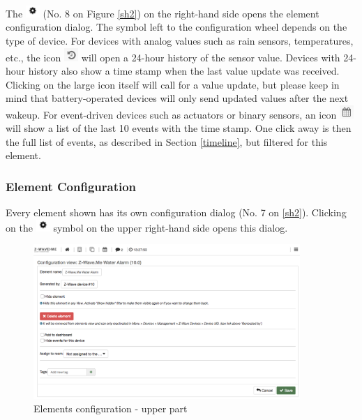The \includegraphics[width=0.04\textwidth]{pngs/wheel.png} (No. 8 on Figure \ref{sh2}) on 
the right-hand side opens the element configuration dialog. The symbol left to the configuration 
wheel depends on the type of device. For devices with analog values such as rain sensors, 
temperatures, etc., the icon \includegraphics[width=0.04\textwidth]{pngs/24hour.png} will 
open a 24-hour history of the sensor value. Devices 
with 24-hour history also show a time stamp when the last value update was received. 
Clicking on the large icon itself will call for a value update, but please keep in mind 
that battery-operated devices will only send updated values after the next wakeup.
For event-driven devices such as actuators or binary sensors, an icon 
\includegraphics[width=0.04\textwidth]{pngs/10events.png}
will show a list 
of the last 10 events with the time stamp. One click away is then the full list of 
events, as described in Section \ref{timeline}, but filtered for this element.

\subsubsection{Element Configuration}
\label{ElementConfiguration}

Every element shown has its own configuration dialog (No. 7 on \ref{sh2}). Clicking 
on the \includegraphics[width=0.04\textwidth]{pngs/wheel.png} symbol on the upper right-hand 
side opens this dialog.

\begin{figure}
\begin{center}
\includegraphics[width=0.9\textwidth]{pngs/cap4/elementconfiguration.png}
\caption{Elements configuration - upper part}
\label{sh5}
\end{center}
\end{figure}

